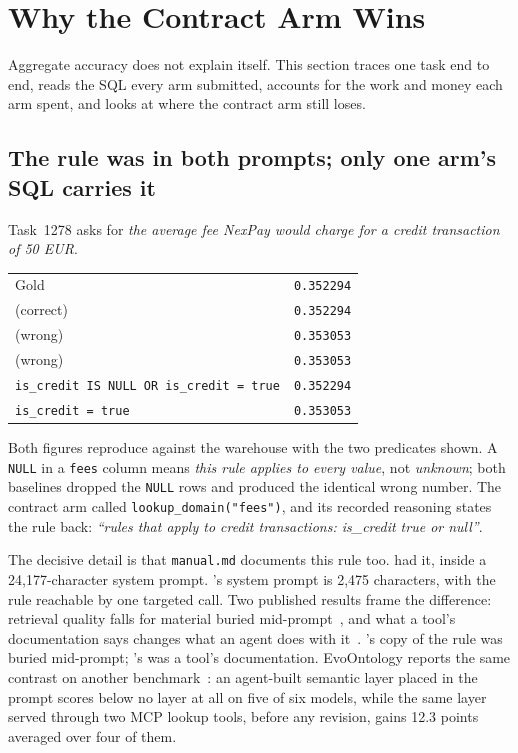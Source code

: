 \section{Why the Contract Arm Wins}
\label{sec:why}

Aggregate accuracy does not explain itself. This section traces one task end
to end, reads the SQL every arm submitted, accounts for the work and money
each arm spent, and looks at where the contract arm still loses.

\subsection{The rule was in both prompts; only one arm's SQL carries it}
\label{sec:reach}
\label{sec:clauses}

Task~1278 asks for \emph{the average fee NexPay would charge for a credit
transaction of 50 EUR}.

\begin{center}
\footnotesize
\setlength{\tabcolsep}{4pt}
\begin{tabular}{@{}lr@{}}
\toprule
Gold      & \texttt{0.352294} \\
\armC{} (correct)  & \texttt{0.352294} \\
\armM{} (wrong)    & \texttt{0.353053} \\
\armS{} (wrong)    & \texttt{0.353053} \\
\midrule
\texttt{is\_credit IS NULL OR is\_credit = true} & \texttt{0.352294} \\
\texttt{is\_credit = true} & \texttt{0.353053} \\
\bottomrule
\end{tabular}
\end{center}

Both figures reproduce against the warehouse with the two predicates
shown. A \texttt{NULL} in a \texttt{fees} column means \emph{this rule
applies to every value}, not \emph{unknown}; both baselines dropped the
\texttt{NULL} rows and produced the identical wrong number. The contract arm called
\texttt{lookup\_domain("fees")}, and its recorded reasoning states the rule
back: \emph{``rules that apply to credit transactions: is\_credit true or
null''}.

The decisive detail is that \texttt{manual.md} documents this rule too.
\armM{} had it, inside a 24{,}177-character system prompt. \armC{}'s system
prompt is 2{,}475 characters, with the rule reachable by one targeted call.
Two published results frame the difference: retrieval quality falls for
material buried mid-prompt~\cite{lost-in-the-middle}, and what a tool's
documentation says changes what an agent does with
it~\cite{tool-documentation}. \armM{}'s copy of the rule was buried
mid-prompt; \armC{}'s was a tool's documentation. EvoOntology reports the
same contrast on another benchmark~\cite{evoontology}: an agent-built
semantic layer placed in the prompt scores below no layer at all on five
of six models, while the same layer served through two MCP lookup tools,
before any revision, gains 12.3 points averaged over four of them.

